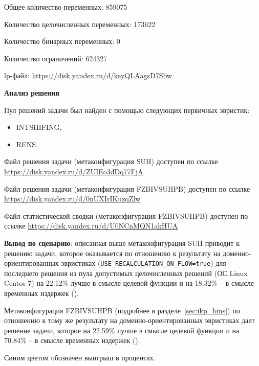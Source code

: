 \documentclass[%
	11pt,
	a4paper,
	utf8,
		]{article}
\begin{document}
Общее количество переменных: 859075

Количество целочисленных переменных: 173622

Количество бинарных переменных: 0

Количество ограничений: 624327

lp-файл: \url{https://disk.yandex.ru/d/keyQLAagsD7Sbw}

\vspace*{5mm}\textbf{Анализ решения}\vspace*{1mm}

Пул решений задачи был найден с помощью следующих первичных эвристик:
\begin{itemize}
	\item INTSHIFING,
	
	\item RENS.
\end{itemize}

Файл решения задачи (метаконфигурация SUH) доступен по ссылке \url{https://disk.yandex.ru/d/ZUIEo3dDq77FjA}

Файл решения задачи (метаконфигурация FZBIVSUHPB) доступен по ссылке \url{https://disk.yandex.ru/d/0nUXIrIKuzqZlw}

Файл статистической сводки (метаконфигурация FZBIVSUHPB) доступен по ссылке \url{https://disk.yandex.ru/d/U0NCnMQN1akHUA}

\vspace*{3mm}
\textbf{Вывод по сценарию}: описанная выше метаконфигурация SUH приводит к решению задачи, которое оказывается по отношению к результату на доменно-ориентированных эвристиках (\verb|USE_RECALCULATION_ON_FLOW=true|) для последнего решения из пула допустимых целочисленных решений (ОС Linux Centos 7) на 22.12\% лучше в смысле целевой функции и на 18.32\% -- в смысле временных издержек ().

Метаконфигурация FZBIVSUHPB (подробнее в разделе~\ref{sec:ikp_bins}) по отношению к тому же результату на доменно-ориентированных эвристиках дает решение задачи, которое на 22.59\% лучше в смысле целевой функции и на 70.84\% -- в смысле временных издержек ().

Синим цветом обозначен выигрыш в процентах.
\end{document}

